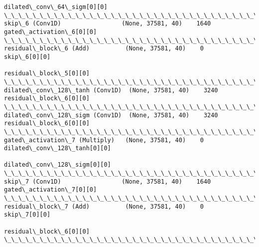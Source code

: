 \documentclass[11pt]{article}
\begin{document}
\begin{Verbatim}[commandchars=\\\{\}]
                                                                 dilated\_conv\_64\_sigm[0][0]       
\_\_\_\_\_\_\_\_\_\_\_\_\_\_\_\_\_\_\_\_\_\_\_\_\_\_\_\_\_\_\_\_\_\_\_\_\_\_\_\_\_\_\_\_\_\_\_\_\_\_\_\_\_\_\_\_\_\_\_\_\_\_\_\_\_\_\_\_\_\_\_\_\_\_\_\_\_\_\_\_\_\_\_\_\_\_\_\_\_\_\_\_\_\_\_\_\_\_
skip\_6 (Conv1D)                 (None, 37581, 40)    1640        gated\_activation\_6[0][0]         
\_\_\_\_\_\_\_\_\_\_\_\_\_\_\_\_\_\_\_\_\_\_\_\_\_\_\_\_\_\_\_\_\_\_\_\_\_\_\_\_\_\_\_\_\_\_\_\_\_\_\_\_\_\_\_\_\_\_\_\_\_\_\_\_\_\_\_\_\_\_\_\_\_\_\_\_\_\_\_\_\_\_\_\_\_\_\_\_\_\_\_\_\_\_\_\_\_\_
residual\_block\_6 (Add)          (None, 37581, 40)    0           skip\_6[0][0]                     
                                                                 residual\_block\_5[0][0]           
\_\_\_\_\_\_\_\_\_\_\_\_\_\_\_\_\_\_\_\_\_\_\_\_\_\_\_\_\_\_\_\_\_\_\_\_\_\_\_\_\_\_\_\_\_\_\_\_\_\_\_\_\_\_\_\_\_\_\_\_\_\_\_\_\_\_\_\_\_\_\_\_\_\_\_\_\_\_\_\_\_\_\_\_\_\_\_\_\_\_\_\_\_\_\_\_\_\_
dilated\_conv\_128\_tanh (Conv1D)  (None, 37581, 40)    3240        residual\_block\_6[0][0]           
\_\_\_\_\_\_\_\_\_\_\_\_\_\_\_\_\_\_\_\_\_\_\_\_\_\_\_\_\_\_\_\_\_\_\_\_\_\_\_\_\_\_\_\_\_\_\_\_\_\_\_\_\_\_\_\_\_\_\_\_\_\_\_\_\_\_\_\_\_\_\_\_\_\_\_\_\_\_\_\_\_\_\_\_\_\_\_\_\_\_\_\_\_\_\_\_\_\_
dilated\_conv\_128\_sigm (Conv1D)  (None, 37581, 40)    3240        residual\_block\_6[0][0]           
\_\_\_\_\_\_\_\_\_\_\_\_\_\_\_\_\_\_\_\_\_\_\_\_\_\_\_\_\_\_\_\_\_\_\_\_\_\_\_\_\_\_\_\_\_\_\_\_\_\_\_\_\_\_\_\_\_\_\_\_\_\_\_\_\_\_\_\_\_\_\_\_\_\_\_\_\_\_\_\_\_\_\_\_\_\_\_\_\_\_\_\_\_\_\_\_\_\_
gated\_activation\_7 (Multiply)   (None, 37581, 40)    0           dilated\_conv\_128\_tanh[0][0]      
                                                                 dilated\_conv\_128\_sigm[0][0]      
\_\_\_\_\_\_\_\_\_\_\_\_\_\_\_\_\_\_\_\_\_\_\_\_\_\_\_\_\_\_\_\_\_\_\_\_\_\_\_\_\_\_\_\_\_\_\_\_\_\_\_\_\_\_\_\_\_\_\_\_\_\_\_\_\_\_\_\_\_\_\_\_\_\_\_\_\_\_\_\_\_\_\_\_\_\_\_\_\_\_\_\_\_\_\_\_\_\_
skip\_7 (Conv1D)                 (None, 37581, 40)    1640        gated\_activation\_7[0][0]         
\_\_\_\_\_\_\_\_\_\_\_\_\_\_\_\_\_\_\_\_\_\_\_\_\_\_\_\_\_\_\_\_\_\_\_\_\_\_\_\_\_\_\_\_\_\_\_\_\_\_\_\_\_\_\_\_\_\_\_\_\_\_\_\_\_\_\_\_\_\_\_\_\_\_\_\_\_\_\_\_\_\_\_\_\_\_\_\_\_\_\_\_\_\_\_\_\_\_
residual\_block\_7 (Add)          (None, 37581, 40)    0           skip\_7[0][0]                     
                                                                 residual\_block\_6[0][0]           
\_\_\_\_\_\_\_\_\_\_\_\_\_\_\_\_\_\_\_\_\_\_\_\_\_\_\_\_\_\_\_\_\_\_\_\_\_\_\_\_\_\_\_\_\_\_\_\_\_\_\_\_\_\_\_\_\_\_\_\_\_\_\_\_\_\_\_\_\_\_\_\_\_\_\_\_\_\_\_\_\_\_\_\_\_\_\_\_\_\_\_\_\_\_\_\_\_\_

\end{Verbatim}
\end{document}
